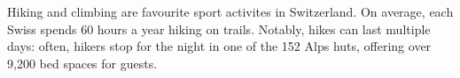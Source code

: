 Hiking and climbing are favourite sport activites in Switzerland.
On average, each Swiss spends 60 hours a year hiking on trails.
Notably, hikes can last multiple days: often, hikers stop for the night in one of the 152 Alps huts, offering over 9,200 bed spaces for guests.
